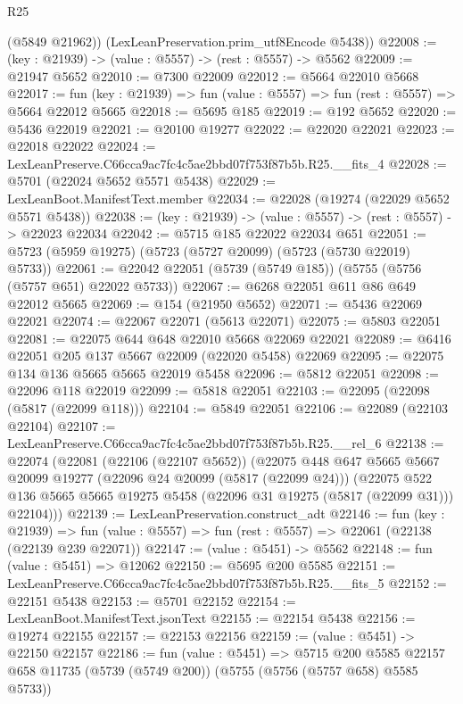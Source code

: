 \begin{lexlean}{R25}
\begin{coremodule}
        (@5849 @21962))
      (LexLeanPreservation.prim_utf8Encode @5438))
@22008 := (key : @21939) -> (value : @5557) -> (rest : @5557) -> @5562
@22009 := @21947 @5652
@22010 := @7300 @22009
@22012 := @5664 @22010 @5668
@22017 := fun (key : @21939) => fun (value : @5557) => fun (rest : @5557) => @5664 @22012 @5665
@22018 := @5695 @185
@22019 := @192 @5652
@22020 := @5436 @22019
@22021 := @20100 @19277
@22022 := @22020 @22021
@22023 := @22018 @22022
@22024 := LexLeanPreserve.C66cca9ac7fc4c5ae2bbd07f753f87b5b.R25.__fits_4
@22028 := @5701 (@22024 @5652 @5571 @5438)
@22029 := LexLeanBoot.ManifestText.member
@22034 := @22028 (@19274 (@22029 @5652 @5571 @5438))
@22038 := (key : @21939) -> (value : @5557) -> (rest : @5557) -> @22023 @22034
@22042 := @5715 @185 @22022 @22034 @651
@22051 := @5723 (@5959 @19275) (@5723 (@5727 @20099) (@5723 (@5730 @22019) @5733))
@22061 := @22042 @22051 (@5739 (@5749 @185)) (@5755 (@5756 (@5757 @651) @22022 @5733))
@22067 := @6268 @22051 @611 @86 @649 @22012 @5665
@22069 := @154 (@21950 @5652)
@22071 := @5436 @22069 @22021
@22074 := @22067 @22071 (@5613 @22071)
@22075 := @5803 @22051
@22081 := @22075 @644 @648 @22010 @5668 @22069 @22021
@22089 := @6416 @22051 @205 @137 @5667 @22009 (@22020 @5458) @22069
@22095 := @22075 @134 @136 @5665 @5665 @22019 @5458
@22096 := @5812 @22051
@22098 := @22096 @118 @22019
@22099 := @5818 @22051
@22103 := @22095 (@22098 (@5817 (@22099 @118)))
@22104 := @5849 @22051
@22106 := @22089 (@22103 @22104)
@22107 := LexLeanPreserve.C66cca9ac7fc4c5ae2bbd07f753f87b5b.R25.__rel_6
@22138 := @22074
    (@22081
      (@22106 (@22107 @5652))
      (@22075
        @448
        @647
        @5665
        @5667
        @20099
        @19277
        (@22096 @24 @20099 (@5817 (@22099 @24)))
        (@22075
          @522
          @136
          @5665
          @5665
          @19275
          @5458
          (@22096 @31 @19275 (@5817 (@22099 @31)))
          @22104)))
@22139 := LexLeanPreservation.construct_adt
@22146 := fun (key : @21939) =>
  fun (value : @5557) => fun (rest : @5557) => @22061 (@22138 (@22139 @239 @22071))
@22147 := (value : @5451) -> @5562
@22148 := fun (value : @5451) => @12062
@22150 := @5695 @200 @5585
@22151 := LexLeanPreserve.C66cca9ac7fc4c5ae2bbd07f753f87b5b.R25.__fits_5
@22152 := @22151 @5438
@22153 := @5701 @22152
@22154 := LexLeanBoot.ManifestText.jsonText
@22155 := @22154 @5438
@22156 := @19274 @22155
@22157 := @22153 @22156
@22159 := (value : @5451) -> @22150 @22157
@22186 := fun (value : @5451) =>
  @5715
    @200
    @5585
    @22157
    @658
    @11735
    (@5739 (@5749 @200))
    (@5755 (@5756 (@5757 @658) @5585 @5733))

\end{coremodule}
\end{lexlean}
